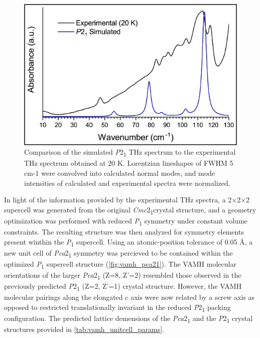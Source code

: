 \begin{figure}[ht!]
  \center
  \includegraphics[width=1\linewidth]{src/figures/VAMH_figures/vamh_fig7.png}
  \caption{Comparison of the simulated \textit{P}2\textsubscript{1} THz spectrum to the experimental THz spectrum obtained at 20 K. Lorentzian lineshapes of FWHM 5 cm-1 were convolved into calculated normal modes, and mode intensities of calculated and experimental spectra were normalized.}
  \label{vamh_p21_thz}
\end{figure}

In light of the information provided by the experimental THz spectra, a 2×2×2 supercell was generated from the original \textit{Cmc}2\textsubscript{1}crystal structure, and a geometry optimization was performed with reduced \textit{P}\textsubscript{1} symmetry under constant volume constraints. The resulting structure was then analyzed for symmetry elements present winthin the \textit{P}\textsubscript{1} supercell. Using an atomic-position tolerance of 0.05 Å, a new unit cell of \textit{Pca}2\textsubscript{1} symmetry was percieved to be contained within the optimized \textit{P}\textsubscript{1} supercell structure (\autoref{fig:vamh_pca21}). The VAMH molecular orientations of the larger \textit{Pca}2\textsubscript{1} (Z=8, Z’=2) resembled those observed in the previously predicted \textit{P}2\textsubscript{1} (Z=2, Z’=1) crystal structure. However, the VAMH molecular pairings along the elongated c axis were now related by a screw axis as opposed to restricted translationally invariant in the reduced \textit{P}2\textsubscript{1} packing configuration. The predicted lattice demensions of the \textit{Pca}2\textsubscript{1} and the \textit{P}2\textsubscript{1} crystal structures provided in \autoref{tab:vamh_unitcell_params}. 

